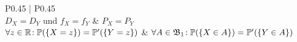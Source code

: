 \begin{table}
\begin{tabular}{P{0.45\linewidth} | P{0.45\linewidth}}
  \\

$D_X = D_Y$ und $f_X = f_Y$ &
$P_X=P_Y$  \\
$\forall z\in\mathbb{R}\!: \mathbb{P}(\{X=z\}) = \mathbb{P}'(\{Y=z\})$  &
$\forall A\in\mathfrak{B}_1\!: \mathbb{P}(\{X \in A\}) = \mathbb{P}'(\{Y \in A\})$ \\

\end{tabular}
\end{table}
